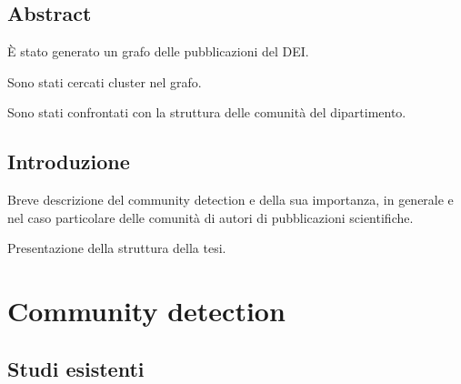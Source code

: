 \documentclass[12pt,a4paper,twoside]{report}
\begin{document}
\whitePage


\tableofcontents





\whitePage



\newpage
{}
\setcounter{page}{1}
\section*{Abstract} \label{abstract} %
È stato generato un grafo delle pubblicazioni del DEI.

Sono stati cercati cluster nel grafo.

Sono stati confrontati con la struttura delle comunità del dipartimento.


\section*{Introduzione} \label{introduzione}

Breve descrizione del community detection e della sua importanza, in generale e nel caso particolare
delle comunità di autori di pubblicazioni scientifiche.

Presentazione della struttura della tesi.



\whitePage
\chapter{Community detection} \label{cap:comdet}

\section{Studi esistenti} \label{sec:storia}
\end{document}
